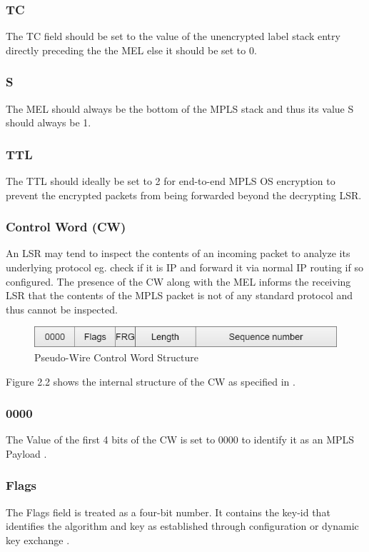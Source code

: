\subsubsection*{TC}
The TC field should be set to the value of the unencrypted label stack entry directly preceding the the MEL else it should be set to 0.

\subsubsection*{S}
The MEL should always be the bottom of the MPLS stack and thus its value S should always be 1.

\subsubsection*{TTL}
The TTL should ideally be set to 2 for end-to-end MPLS OS encryption to prevent the encrypted packets from being forwarded beyond the decrypting LSR.

\subsubsection{Control Word (CW)}
An LSR may tend to inspect the contents of an incoming packet to analyze its underlying protocol eg. check if it is IP and forward it via normal IP routing if so configured. The presence of the CW along with the MEL informs the receiving LSR that the contents of the MPLS packet is not of any standard protocol and thus cannot be inspected.

\begin{figure}[H]
       \centering\includegraphics[width=\textwidth]{images/6_Code_Word.jpg}
       \caption{Pseudo-Wire Control Word Structure}
       \label{fig:compbest}
\end{figure}

Figure 2.2 shows the internal structure of the CW as specified in \cite{mpls-os-internet-draft}.
\subsubsection*{0000}
The Value of the first 4 bits of the CW is set to 0000 to identify it as an MPLS Payload \cite{rfc4385}.

\subsubsection*{Flags}
The Flags field is treated as a four-bit number. It contains the key-id that identifies the algorithm and key as established through configuration or dynamic key exchange \cite{mpls-os-internet-draft}.

